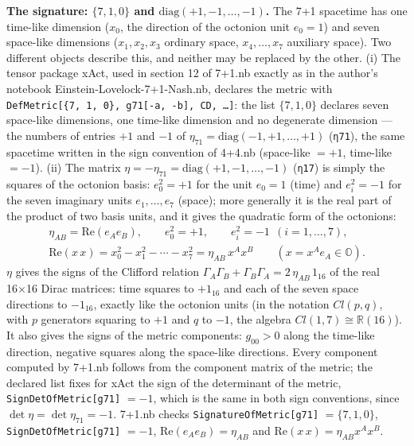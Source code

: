 \documentclass[10pt,a4paper]{article}
\begin{document}
\textbf{The signature: $\{7,1,0\}$ and $\mathrm{diag}(+1,-1,\dots,-1)$.} The 7+1 spacetime has one time-like dimension ($x_0$, the direction of the octonion unit $e_0=1$) and seven space-like dimensions ($x_1,x_2,x_3$ ordinary space, $x_4,\dots,x_7$ auxiliary space). Two different objects describe this, and neither may be replaced by the other. (i) The tensor package xAct, used in section 12 of 7+1.nb exactly as in the author’s notebook Einstein-Lovelock-7+1-Nash.nb, declares the metric with \texttt{DefMetric[\{7, 1, 0\}, g71[-a, -b], CD, …]}: the list $\{7,1,0\}$ declares seven space-like dimensions, one time-like dimension and no degenerate dimension — the numbers of entries $+1$ and $-1$ of $\eta_{71}=\mathrm{diag}(-1,+1,\dots,+1)$ (\texttt{η71}), the same spacetime written in the sign convention of 4+4.nb (space-like $=+1$, time-like $=-1$). (ii) The matrix $\eta=-\eta_{71}=\mathrm{diag}(+1,-1,\dots,-1)$ (\texttt{η17}) is simply the squares of the octonion basis: $e_0^2=+1$ for the unit $e_0=1$ (time) and $e_i^2=-1$ for the seven imaginary units $e_1,\dots,e_7$ (space); more generally it is the real part of the product of two basis units, and it gives the quadratic form of the octonions:
\begin{gather*}
\eta_{AB}=\mathrm{Re}(e_Ae_B),\qquad e_0^2=+1,\qquad e_i^2=-1\ \ (i=1,\dots,7),\\ \mathrm{Re}(x\,x)=x_0^2-x_1^2-\cdots-x_7^2=\eta_{AB}\,x^Ax^B\qquad (x=x^Ae_A\in\mathbb O).
\end{gather*}
$\eta$ gives the signs of the Clifford relation $\Gamma_A\Gamma_B+\Gamma_B\Gamma_A=2\,\eta_{AB}\,1_{16}$ of the real 16×16 Dirac matrices: time squares to $+1_{16}$ and each of the seven space directions to $-1_{16}$, exactly like the octonion units (in the notation $Cl(p,q)$, with $p$ generators squaring to $+1$ and $q$ to $-1$, the algebra $Cl(1,7)\cong\mathbb R(16)$). It also gives the signs of the metric components: $g_{00}>0$ along the time-like direction, negative squares along the space-like directions. Every component computed by 7+1.nb follows from the component matrix of the metric; the declared list fixes for xAct the sign of the determinant of the metric, \texttt{SignDetOfMetric[g71]} $=-1$, which is the same in both sign conventions, since $\det \eta=\det \eta_{71}=-1$. 7+1.nb checks \texttt{SignatureOfMetric[g71]} $=\{7,1,0\}$, \texttt{SignDetOfMetric[g71]} $=-1$, $\mathrm{Re}(e_Ae_B)=\eta_{AB}$ and $\mathrm{Re}(x\,x)=\eta_{AB}x^Ax^B$.
\end{document}
